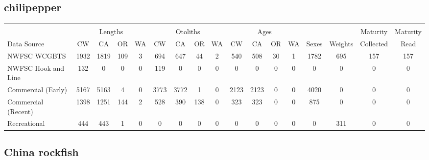\documentclass[12pt,]{article}
\begin{document}
\FloatBarrier  

\subsection{chilipepper}\label{chilipepper}

\begin{table}[ht]
\centering
\begingroup\fontsize{10pt}{10pt}\selectfont
\begin{tabular}{|l|cccc|cccc|cccc|c|c|c|c|}
  \hline
 &  &  &  &  &  &  &  &  &  &  &  &  &  &  &  &  \\ 
   & \multicolumn{4}{c}{Lengths} &  \multicolumn{4}{c}{Otoliths} & \multicolumn{4}{c}{Ages} &  & & Maturity & Maturity\\
 Data Source & CW & CA & OR & WA & CW & CA & OR & WA & CW & CA & OR & WA & Sexes & Weights & Collected & Read\\
 \hline
NWFSC WCGBTS & 1932 & 1819 & 109 & 3 & 694 & 647 & 44 & 2 & 540 & 508 & 30 & 1 & 1782 & 695 & 157 & 157 \\ 
  NWFSC Hook and Line & 132 & 0 & 0 & 0 & 119 & 0 & 0 & 0 & 0 & 0 & 0 & 0 & 0 & 0 & 0 & 0 \\ 
  Commercial (Early) & 5167 & 5163 & 4 & 0 & 3773 & 3772 & 1 & 0 & 2123 & 2123 & 0 & 0 & 4020 & 0 & 0 & 0 \\ 
  Commercial (Recent) & 1398 & 1251 & 144 & 2 & 528 & 390 & 138 & 0 & 323 & 323 & 0 & 0 & 875 & 0 & 0 & 0 \\ 
  Recreational & 444 & 443 & 1 & 0 & 0 & 0 & 0 & 0 & 0 & 0 & 0 & 0 & 0 & 311 & 0 & 0 \\ 
   \hline
\end{tabular}
\endgroup
\end{table}

\FloatBarrier  

\subsection{China rockfish}\label{china-rockfish}
\end{document}
